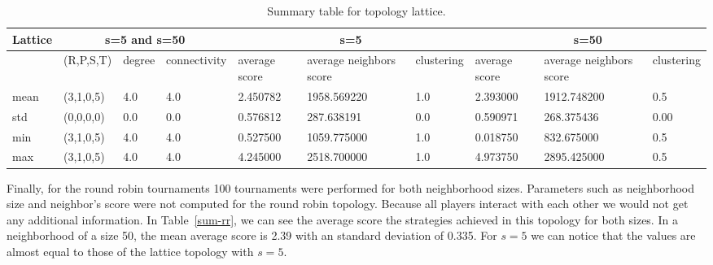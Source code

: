 \begin{table}[!hbtp]
\centering
\begin{adjustbox}{width=1\textwidth}
\small
\begin{tabular}{@{}|l|l|l|l|l|l|l|l|l|l|@{}}
\toprule
Lattice & \multicolumn{3}{c|}{s=5 and s=50} & \multicolumn{3}{c|}{s=5}                             & \multicolumn{3}{c|}{s=50}                            \\ \midrule
       & (R,P,S,T) & degree & connectivity & average score & average neighbors score & clustering & average score & average neighbors score & clustering \\ \midrule
mean   & (3,1,0,5) & 4.0    & 4.0          & 2.450782      & 1958.569220             & 1.0        & 2.393000      & 1912.748200             & 0.5        \\ \midrule
std    & (0,0,0,0) & 0.0    & 0.0          & 0.576812      & 287.638191              & 0.0        & 0.590971      & 268.375436              & 0.00       \\ \midrule
min    & (3,1,0,5) & 4.0    & 4.0          & 0.527500      & 1059.775000             & 1.0        & 0.018750      & 832.675000              & 0.5        \\ \midrule
max    & (3,1,0,5) & 4.0    & 4.0          & 4.245000      & 2518.700000             & 1.0        & 4.973750      & 2895.425000             & 0.5        \\ \bottomrule
\end{tabular}
\end{adjustbox}
\caption{Summary table for topology lattice.}
\label{sum-lattice}
\end{table}

Finally, for the round robin tournaments 100 tournaments were performed for both
neighborhood sizes. Parameters such as neighborhood size and neighbor's score
were not computed for the round robin topology. Because all players
interact with each other we would not get any additional information. In
Table~\ref{sum-rr}, we can see the average score the strategies achieved
in this topology for both sizes. In a neighborhood of a size 50, the mean average
score is 2.39 with an standard deviation of 0.335. For \(s=5\) we can notice that the values
are almost equal to those of the lattice topology with \(s=5\).

